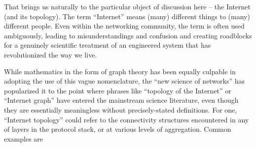 That brings us naturally to the particular object of discussion here
-- the Internet (and its topology).  The term ``Internet'' means
(many) different things to (many) different people.  Even within the
networking community, the term is often used ambiguously, leading to
misunderstandings and confusion and creating roadblocks for a
genuinely scientific treatment of an engineered system that has
revolutionized the way we live.

While mathematics in the form of graph theory has been equally
culpable in adopting the use of this vague nomenclature, the ``new
science of networks'' has popularized it to the point where phrases
like ``topology of the Internet'' or ``Internet graph'' have entered
the mainstream science literature, even though they are essentially
meaningless without precisely-stated definitions.  For one, ``Internet
topology'' could refer to the connectivity structures encountered in
any of layers in the protocol stack, or at various levels of
aggregation. Common examples are
